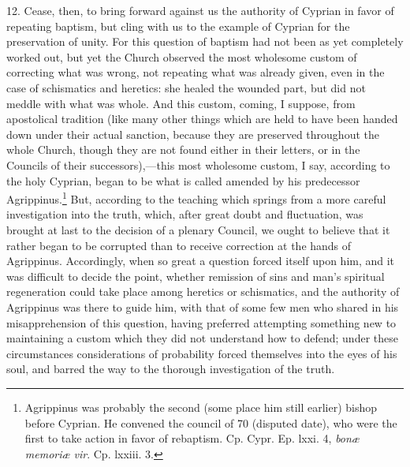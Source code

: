 12. Cease, then, to bring forward against us the authority of Cyprian in favor of repeating baptism, but cling with us to the example of Cyprian for the preservation of unity. For this question of baptism had not been as yet completely worked out, but yet the Church observed the most wholesome custom of correcting what was wrong, not repeating what was already given, even in the case of schismatics and heretics: she healed the wounded part, but did not meddle with what was whole. And this custom, coming, I suppose, from apostolical tradition (like many other things which are held to have been handed down under their actual sanction, because they are preserved throughout the whole Church, though they are not found either in their letters, or in the Councils of their successors),—this most wholesome custom, I say, according to the holy Cyprian, began to be what is called amended by his predecessor Agrippinus.\footnote{\par  Agrippinus was probably the second (some place him still earlier) bishop before Cyprian. He convened the council of 70 (disputed date), who were the first to take action in favor of rebaptism. Cp. Cypr. Ep. lxxi. 4, \emph{bonæ memoriæ vir}. Cp. lxxiii. 3.} But, according to the teaching which springs from a more careful investigation into the truth, which, after great doubt and fluctuation, was brought at last to the decision of a plenary Council, we ought to believe that it rather began to be corrupted than to receive correction at the hands of Agrippinus. Accordingly, when so great a question forced itself upon him, and it was difficult to decide the point, whether remission of sins and man’s spiritual regeneration could take place among heretics or schismatics, and the authority of Agrippinus was there to guide him, with that of some few men who shared in his misapprehension of this question, having preferred attempting something new to maintaining a custom which they did not understand how to defend; under these circumstances considerations of probability forced themselves into the eyes of his soul, and barred the way to the thorough investigation of the truth.


